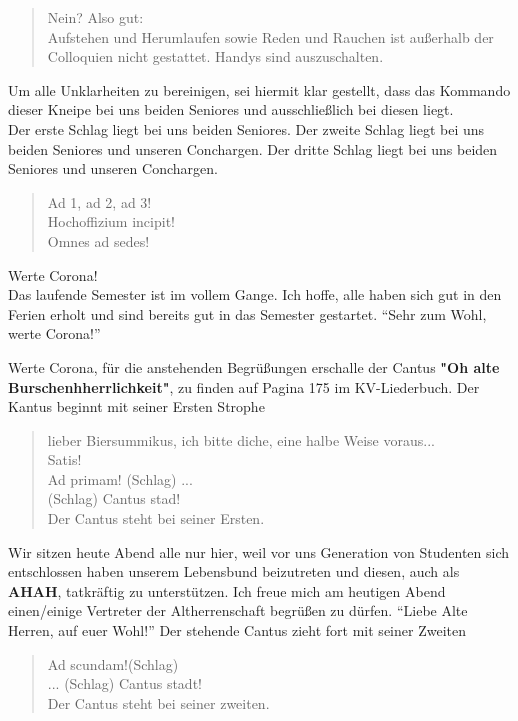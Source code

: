 \begin{quote}
    Nein? Also gut:\\
    Aufstehen und Herumlaufen sowie Reden und Rauchen ist außerhalb 
    der Colloquien nicht gestattet. Handys sind auszuschalten.
\end{quote}

Um alle Unklarheiten zu bereinigen, sei hiermit klar gestellt,
dass das Kommando dieser Kneipe bei uns beiden Seniores und 
ausschließlich bei diesen liegt.\\
Der erste Schlag liegt bei uns beiden Seniores.
Der zweite Schlag liegt bei uns beiden Seniores und unseren Conchargen.
Der dritte Schlag liegt bei uns beiden Seniores und unseren Conchargen.

\begin{quote}
    Ad 1, ad 2, ad 3!\\
    Hochoffizium incipit!\\
    Omnes ad sedes!
\end{quote}

Werte Corona!\\
Das laufende Semester ist im vollem Gange. Ich hoffe, alle haben sich
gut in den Ferien erholt und sind bereits gut in das Semester gestartet.
\enquote{Sehr zum Wohl, werte Corona!}

Werte Corona, für die anstehenden Begrüßungen erschalle der Cantus 
\textbf{"Oh alte Burschenhherrlichkeit"}, zu finden auf Pagina 175
im KV-Liederbuch. Der Kantus beginnt mit seiner Ersten Strophe

\begin{quote}
    lieber Biersummikus, ich bitte diche, eine halbe Weise voraus...\\
    Satis!\\
    Ad primam! (Schlag)
    ...\\
    (Schlag) Cantus stad!\\
    Der Cantus steht bei seiner Ersten.\\
\end{quote}

Wir sitzen heute Abend alle nur hier, weil vor uns Generation von Studenten
sich entschlossen haben unserem Lebensbund
beizutreten und diesen, auch als \textbf{AHAH}, tatkräftig zu unterstützen.
Ich freue mich am heutigen Abend einen/einige Vertreter der Altherrenschaft
begrüßen zu dürfen.
\enquote{Liebe Alte Herren, auf euer Wohl!}
Der stehende Cantus zieht fort mit seiner Zweiten
\begin{quote}
    Ad scundam!(Schlag)\\
    ...
    (Schlag) Cantus stadt!\\
    Der Cantus steht bei seiner zweiten.
\end{quote}

